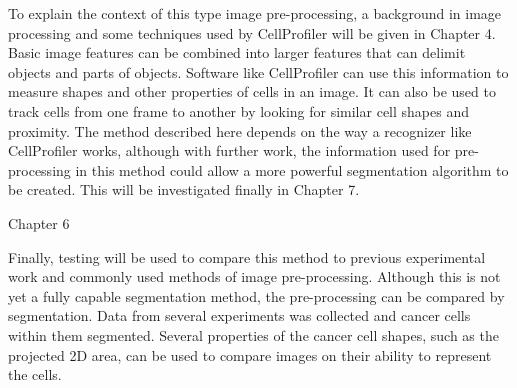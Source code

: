 To explain the context of this type image pre-processing, a background in image processing and some techniques used by CellProfiler will be given in Chapter 4. Basic image features can be combined into larger features that can delimit objects and parts of objects. Software like CellProfiler can use this information to measure shapes and other properties of cells in an image. It can also be used to track cells from one frame to another by looking for similar cell shapes and proximity. The method described here depends on the way a recognizer like CellProfiler works, although with further work, the information used for pre-processing in this method could allow a more powerful segmentation algorithm to be created. This will be investigated finally in Chapter 7.

Chapter 6

Finally, testing will be used to compare this method to previous experimental work and commonly used methods of image pre-processing. Although this is not yet a fully capable segmentation method, the pre-processing can be compared by segmentation. Data from several experiments was collected and cancer cells within them segmented. Several properties of the cancer cell shapes, such as the projected 2D area, can be used to compare images on their ability to represent the cells.
